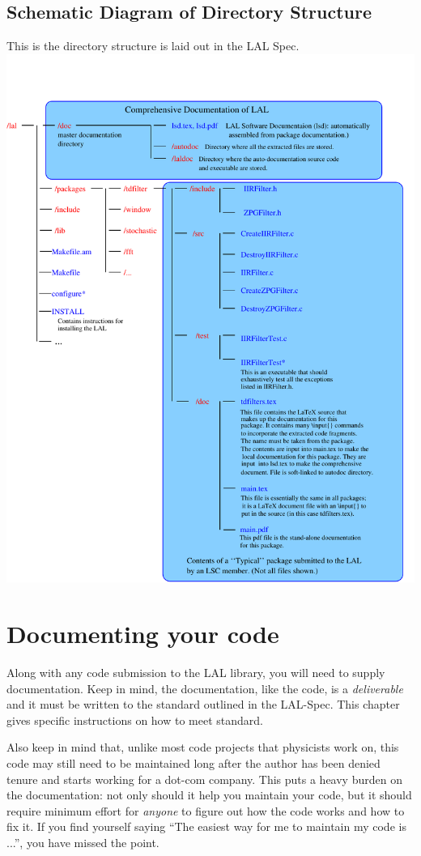 \documentclass[oneside]{book}
\begin{document}
\section{Schematic Diagram of Directory Structure}
This is the  directory structure is laid out in the LAL Spec.
\noindent\includegraphics[width=0.9\linewidth,angle=0]{lsdFigDirStructure}

\chapter{Documenting your code}
\label{c:DocumentingCode}

Along with any code submission to the LAL library, you will need to
supply documentation. Keep in mind, the documentation, like the code,
is a {\it deliverable} and it must be written to the standard outlined
in the LAL-Spec.  This chapter gives specific instructions  on how 
to meet standard.

Also keep in mind that, unlike most code projects that physicists work
on, this code may still need to be maintained long after the author
has been denied tenure and starts working for a dot-com company.  This
puts a heavy burden on the documentation: not only should it help you
maintain your code, but it should require minimum effort for {\it
anyone} to figure out how the code works and how to fix it. If you
find yourself saying ``The easiest way for me to maintain my code is
...'', you have missed the point.
\end{document}
